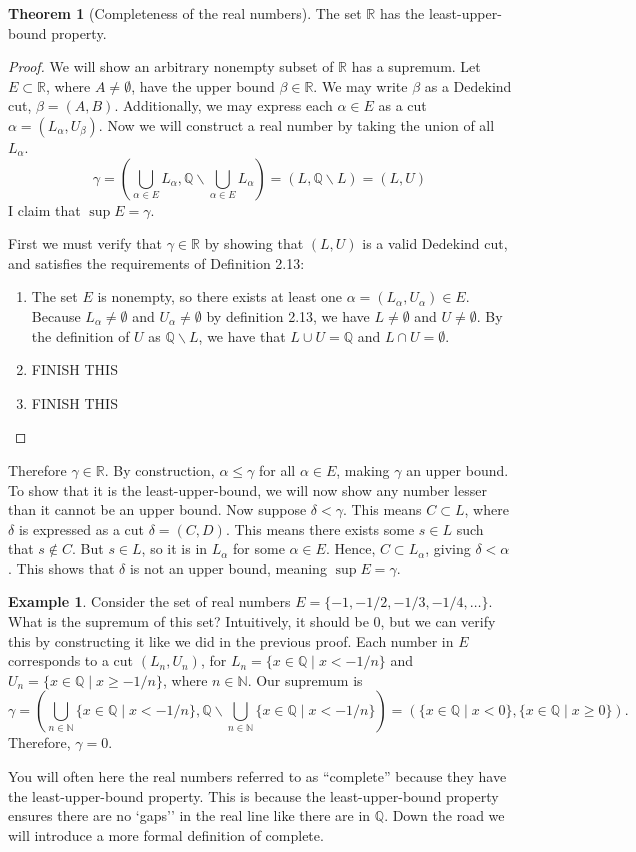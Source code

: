 \documentclass{article}
\newcommand{\N}{\mathbb{N}}
\newcommand{\R}{\mathbb{R}}
\newcommand{\Q}{\mathbb{Q}}
\theoremstyle{definition}
\newtheorem{theorem}{Theorem}[section]
\newtheorem{example}{Example}[section]
\begin{document}
\begin{theorem}[Completeness of the real numbers]
	The set $ \R $ has the least-upper-bound property.
	\begin{proof}
	We will show an arbitrary nonempty subset of $ \R $ has a supremum. Let $ E\subset \R $, where $ A\neq\emptyset $, have the upper bound $ \beta\in\R $. We may write $ \beta $ as a Dedekind cut, $ \beta=(A,B) $. Additionally, we may express each $ \alpha\in E $ as a cut $ \alpha=(L_\alpha,U_\beta) $. Now we will construct a real number by taking the union of all $ L_\alpha $.
	$$ \gamma=\left(\bigcup_{\alpha\in E}L_\alpha,\Q\backslash \bigcup_{\alpha\in E}L_\alpha\right)=(L,\Q\backslash
	 L)=(L,U)$$  
	I claim that $ \sup E=\gamma $.
	
	First we must verify that $ \gamma\in\R $ by showing that $ (L,U) $ is a valid Dedekind cut, and satisfies the requirements of Definition 2.13: 
	\begin{enumerate}
		\item The set $ E $ is nonempty, so there exists at least one $ \alpha=(L_\alpha,U_\alpha)\in E $. Because $ L_\alpha\neq\emptyset $ and $ U_\alpha\neq\emptyset $ by definition 2.13, we have $ L\neq\emptyset $ and $ U\neq\emptyset $. By the definition of $ U $ as $ \Q\backslash L $, we have that $  L\cup U=\Q$ and $ L\cap U=\emptyset $. 
 		\item {\color{red}FINISH THIS} 
		\item  {\color{red}FINISH THIS} 
	\end{enumerate}
	\end{proof}
Therefore $ \gamma\in\R $. By construction, $ \alpha\le\gamma $ for all $ \alpha\in E $, making $ \gamma $ an upper bound. To show that it is the least-upper-bound, we will now show any number lesser than it cannot be an upper bound. Now suppose $ \delta <\gamma $. This means $  C\subset L $, where $ \delta $ is expressed as a cut $ \delta=(C,D) $. This means there exists some $ s\in L $ such that $ s\notin C $. But $ s\in L $, so it is in $ L_\alpha $ for some $ \alpha\in E $. Hence, $ C\subset L_\alpha $, giving $ \delta <\alpha $. This shows that $ \delta $ is not an upper bound, meaning $ \sup E =\gamma$.
\end{theorem}
\begin{example}
	Consider the set of real numbers $ E=\{-1,-1/2,-1/3,-1/4,\ldots\} $. What is the supremum of this set? Intuitively, it should be $ 0 $, but we can verify this by constructing it like we did in the previous proof. Each number in $ E $ corresponds to a cut $ (L_n,U_n) $, for $ L_n=\{x\in\Q\mid x<-1/n\} $ and $ U_n=\{x\in\Q\mid x\ge -1/n\} $, where $ n\in\N $. Our supremum is $$\gamma=\left(\bigcup_{n\in \N}\{x\in\Q\mid x<-1/n\},\Q\backslash \bigcup_{n\in \N}\{x\in\Q\mid x<-1/n\}\right)=(\{x\in\Q\mid x<0\},\{x\in\Q\mid x\ge0\}). $$ Therefore, $ \gamma=0 $.  
\end{example}
You will often here the real numbers referred to as ``complete'' because they have the least-upper-bound property. This is because the least-upper-bound property ensures there are no `gaps'' in the real line like there are in $ \Q $. Down the road we will introduce a more formal definition of complete.
\end{document}
